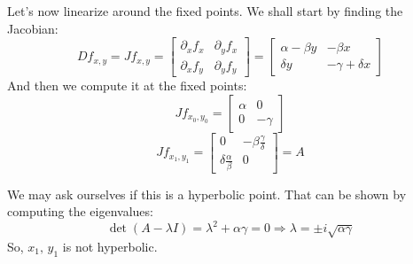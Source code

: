 Let's now linearize around the fixed points. We shall start by finding the Jacobian: \begin{equation*}
    Df_{x,y}=Jf_{x,y}=\begin{bmatrix}
        \partial_x f_x & \partial_y f_x \\
        \partial_x f_y & \partial_y f_y
    \end{bmatrix}=\begin{bmatrix}
        \alpha-\beta y & -\beta x \\
        \delta y & -\gamma+\delta x
    \end{bmatrix}
\end{equation*}
And then we compute it at the fixed points:
\begin{equation*}
    Jf_{x_0, y_0}=\begin{bmatrix}
        \alpha & 0 \\
        0 & -\gamma
    \end{bmatrix}
\end{equation*}
\begin{equation*}
    Jf_{x_1, y_1}=\begin{bmatrix}
        0 & -\beta\frac{\gamma}{\delta}\\
        \delta \frac{\alpha}{\beta} & 0
    \end{bmatrix}=A
\end{equation*}

We may ask ourselves if this is a hyperbolic point. That can be shown by computing the eigenvalues:
\begin{equation*}
    \det(A-\lambda I)=\lambda^2+\alpha\gamma=0 \Rightarrow \lambda= \pm i\sqrt{\alpha\gamma}
\end{equation*}
So, $x_1,\,y_1$ is not hyperbolic. 

